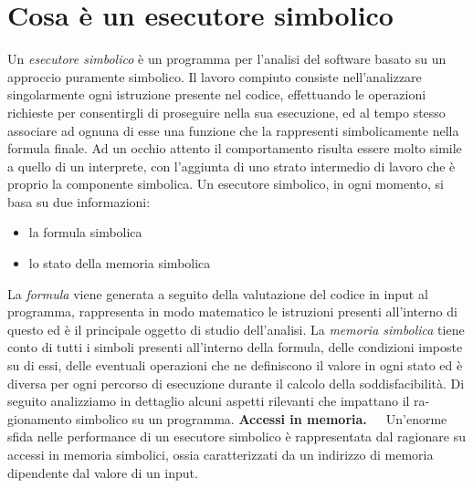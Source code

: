 \documentclass[Lau, oneside]{sapthesis}%
\begin{document}
\section{Cosa è un esecutore simbolico}
Un \textit{esecutore simbolico} è un programma per l'analisi del software basato su un approccio puramente simbolico.
\newline \newline
Il lavoro compiuto consiste nell'analizzare singolarmente ogni istruzione presente nel codice, effettuando le operazioni richieste per consentirgli di proseguire nella sua esecuzione, ed al tempo stesso associare ad ognuna di esse una funzione che la rappresenti simbolicamente nella formula finale.
\newline
Ad un occhio attento il comportamento risulta essere molto simile a quello di un interprete, con l'aggiunta di uno strato intermedio di lavoro che è proprio la componente simbolica. 
\newline \newline
Un esecutore simbolico, in ogni momento, si basa su due informazioni:
\begin{itemize}
    \item la formula simbolica
    \item lo stato della memoria simbolica
\end{itemize}
La \textit{formula} viene generata a seguito della valutazione del codice in input al programma, rappresenta in modo matematico le istruzioni presenti all'interno di questo ed è il principale oggetto di studio dell'analisi.
\newline \newline
La \textit{memoria simbolica} tiene conto di tutti i simboli presenti all'interno della formula, delle condizioni imposte su di essi, delle eventuali operazioni che ne definiscono il valore in ogni stato ed è diversa per ogni percorso di esecuzione durante il calcolo della soddisfacibilità.
\newline \newline
Di seguito analizziamo in dettaglio alcuni aspetti rilevanti che impattano il ra-
gionamento simbolico su un programma.
\newline \newline \newline
\textbf{Accessi in memoria.}\ \ \ Un’enorme sfida nelle performance di un esecutore simbolico è rappresentata dal ragionare su accessi in memoria simbolici, ossia caratterizzati da un indirizzo di memoria dipendente dal valore di un input.
\newline
\end{document}
